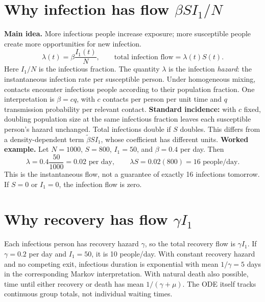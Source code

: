 \documentclass[11pt]{article}
\newcommand{\idea}[1]{\textbf{Main idea.} #1}
\begin{document}
\section{Why infection has flow $\beta SI_1/N$}
\idea{More infectious people increase exposure; more susceptible people create more opportunities for new infection.}
\[
\lambda(t)=\beta\frac{I_1(t)}{N},\qquad
\text{total infection flow}=\lambda(t)S(t).
\]
Here $I_1/N$ is the infectious fraction. The quantity $\lambda$ is the infection \emph{hazard}: the instantaneous infection rate per susceptible person. Under homogeneous mixing, contacts encounter infectious people according to their population fraction. One interpretation is $\beta=cq$, with $c$ contacts per person per unit time and $q$ transmission probability per relevant contact.
\textbf{Standard incidence:} with $c$ fixed, doubling population size at the same infectious fraction leaves each susceptible person's hazard unchanged. Total infections double if $S$ doubles. This differs from a density-dependent term $\widetilde\beta SI_1$, whose coefficient has different units.
\textbf{Worked example.} Let $N=1000$, $S=800$, $I_1=50$, and $\beta=0.4$ per day. Then
\[
\lambda=0.4\frac{50}{1000}=0.02\text{ per day},\qquad
\lambda S=0.02(800)=16\text{ people/day}.
\]
This is the instantaneous flow, not a guarantee of exactly 16 infections tomorrow. If $S=0$ or $I_1=0$, the infection flow is zero.
\section{Why recovery has flow $\gamma I_1$}
Each infectious person has recovery hazard $\gamma$, so the total recovery flow is $\gamma I_1$. If $\gamma=0.2$ per day and $I_1=50$, it is 10 people/day.
With constant recovery hazard and no competing exit, infectious duration is exponential with mean $1/\gamma=5$ days in the corresponding Markov interpretation. With natural death also possible, time until either recovery or death has mean $1/(\gamma+\mu)$. The ODE itself tracks continuous group totals, not individual waiting times.
\newpage
\end{document}

